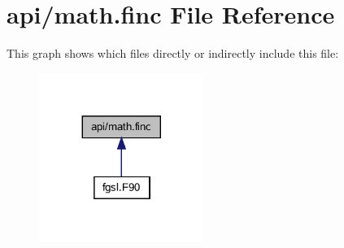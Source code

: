\hypertarget{math_8finc}{}\section{api/math.finc File Reference}
\label{math_8finc}
This graph shows which files directly or indirectly include this file\+:\nopagebreak
\begin{figure}[H]
\begin{center}
\leavevmode
\includegraphics[width=152pt]{math_8finc__dep__incl}
\end{center}
\end{figure}
